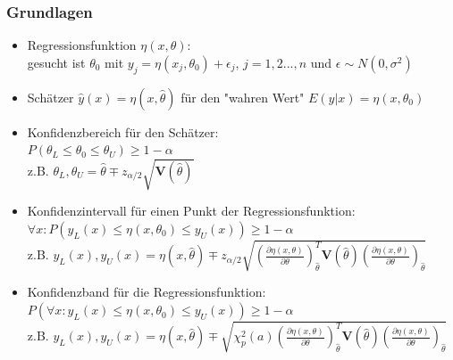 \documentclass[aspectratio=1610, 9pt]{beamer}
\begin{document}
\begin{frame}
  \frametitle{Grundlagen}
  \begin{itemize}
    \item Regressionsfunktion $\eta(x, \theta)$: \\ 
    gesucht ist $\theta_0$ mit $y_j = \eta(x_j, \theta_0) + \epsilon_j$, $j = 1,2...,n$ und $\epsilon \sim N(0, \sigma^2)$ \\
    \item Schätzer $\hat{y}(x) = \eta(x, \hat\theta)$ für den "wahren Wert" $E(y|x) = \eta(x, \theta_0)$ \\
    \item Konfidenzbereich für den Schätzer: \\
    $P\left( \theta_L \le \theta_0 \le \theta_U \right) \geq 1-\alpha$
    \\
    z.B. $\theta_L, \theta_U = \hat\theta \mp z_{\alpha/2}\sqrt{\mathbf{V}(\hat\theta)}$
    \\
    \item Konfidenzintervall für einen Punkt der Regressionsfunktion: \\
    $\forall x: P\left(y_L(x) \le \eta(x, \theta_0) \le y_U(x)\right) \geq 1-\alpha$
    \\
    z.B. $y_L(x), y_U(x) = \eta(x, \hat\theta) \mp 
    z_{\alpha/2}
    \sqrt{
      \left(
        \frac{\partial\eta(x, \theta)}{\partial\theta}
      \right)_{\hat\theta}^T
      \mathbf{V}(\hat\theta)
      \left(
        \frac{\partial\eta(x, \theta)}{\partial\theta}
      \right)_{\hat\theta}
    }$
    \item Konfidenzband für die Regressionsfunktion: \\
    $P\left(\forall x: y_L(x) \le \eta(x, \theta_0) \le y_U(x) \right ) \geq 1-\alpha$
    \\
    z.B. $y_L(x), y_U(x) = \eta(x, \hat\theta) \mp 
    \sqrt{
      \chi_p^2(a)
      \left(
        \frac{\partial\eta(x, \theta)}{\partial\theta}
      \right)_{\hat\theta}^T
      \mathbf{V}(\hat\theta)
      \left(
        \frac{\partial\eta(x, \theta)}{\partial\theta}
      \right)_{\hat\theta}
    }$
  \end{itemize}
\end{frame}
\end{document}
